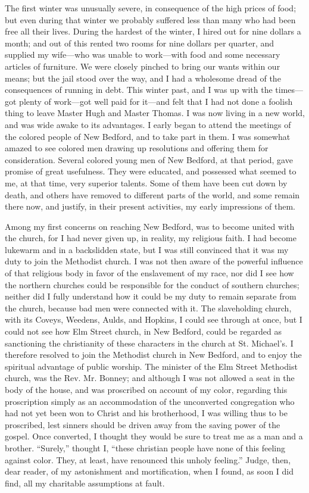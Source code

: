 The first winter was unusually severe, in consequence of the high prices
of food; but even during that winter we probably suffered less than many
who had been free all their lives. During the hardest of the winter, I
hired out for nine dollars a month; and out of this rented two rooms for
nine dollars per quarter, and supplied my wife---who was unable to
work---with food and some necessary articles of furniture. We were
closely pinched to bring our wants within our means; but the jail stood
over the way, and I had a wholesome dread of the consequences of running
in debt. This winter past, and I was up with the times---got plenty of
work---got well paid for it---and felt that I had not done a foolish
thing to leave Master Hugh and Master Thomas. I was now living in a new
world, and was wide awake to its advantages. I early began to attend the
meetings of the colored people of New Bedford, and to take part in them.
I was somewhat amazed to see colored men drawing up resolutions and
offering them for consideration. Several colored young men of New
Bedford, at that period, gave promise of great usefulness. They were
educated, and possessed what seemed to me, at that time, very superior
talents. Some of them have been cut down by death, and others have
removed to different parts of the world, and some remain there now, and
justify, in their present activities, my early impressions of them.

Among my first concerns on reaching New Bedford, was to become united
with the church, for I had {}never given up, in reality, my religious
faith. I had become lukewarm and in a backslidden state, but I was still
convinced that it was my duty to join the Methodist church. I was not
then aware of the powerful influence of that religious body in favor of
the enslavement of my race, nor did I see how the northern churches
could be responsible for the conduct of southern churches; neither did I
fully understand how it could be my duty to remain separate from the
church, because bad men were connected with it. The slaveholding church,
with its Coveys, Weedens, Aulds, and Hopkins, I could see through at
once, but I could not see how Elm Street church, in New Bedford, could
be regarded as sanctioning the christianity of these characters in the
church at St. Michael's. I therefore resolved to join the Methodist
church in New Bedford, and to enjoy the spiritual advantage of public
worship. The minister of the Elm Street Methodist church, was the Rev.
Mr. Bonney; and although I was not allowed a seat in the body of the
house, and was proscribed on account of my color, regarding this
proscription simply as an accommodation of the unconverted congregation
who had not yet been won to Christ and his brotherhood, I was willing
thus to be proscribed, lest sinners should be driven away from the
saving power of the gospel. Once converted, I thought they would be sure
to treat me as a man and a brother. ``Surely,'' thought I, ``these
christian people have none of this feeling against color. They, at
least, have renounced this unholy feeling.'' Judge, then, dear reader,
of my astonishment and mortification, when I found, as {}soon I did
find, all my charitable assumptions at fault.

